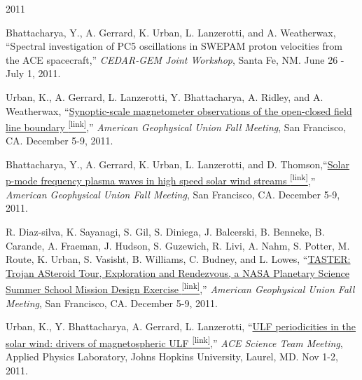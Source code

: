 \documentclass[10pt]{article}
\begin{document}
\begin{center} \Large{2011} \end{center}
\normalsize
\begin{itemize*}

  \item Bhattacharya, Y., A. Gerrard, K. Urban, L. Lanzerotti, and A.
    Weatherwax, ``Spectral investigation of PC5 oscillations in SWEPAM proton
    velocities from the ACE spacecraft,'' {\em CEDAR-GEM Joint
    Workshop}, Santa Fe, NM. June 26 - July 1, 2011.

  \item Urban, K., A. Gerrard, L. Lanzerotti, Y. Bhattacharya, A. Ridley, and A.
    Weatherwax,
    ``\href{https://scholar.google.com/citations?view_op=view_citation&hl=en&user=KTLuoQkAAAAJ&citation_for_view=KTLuoQkAAAAJ:Y0pCki6q_DkC}{Synoptic-scale magnetometer observations of the open-closed
    field line boundary \textsuperscript{\tiny{[link]}}},'' {\em American Geophysical Union Fall
    Meeting}, San Francisco, CA. December 5-9, 2011.

  \item
    Bhattacharya, Y., A. Gerrard, K. Urban, L. Lanzerotti, and D.
    Thomson,``\href{https://scholar.google.com/citations?view_op=view_citation&hl=en&user=KTLuoQkAAAAJ&citation_for_view=KTLuoQkAAAAJ:YsMSGLbcyi4C}{Solar
    p-mode frequency plasma waves in high speed solar wind streams \textsuperscript{\tiny{[link]}}},''
    {\em American Geophysical Union Fall Meeting}, San Francisco,
    CA. December 5-9, 2011.

  \item
    R. Diaz-silva, K. Sayanagi, S. Gil, S. Diniega, J. Balcerski, B. Benneke,
    B. Carande, A. Fraeman, J. Hudson, S. Guzewich, R. Livi, A. Nahm, S.
    Potter, M. Route, K. Urban, S. Vasisht, B. Williams, C. Budney, and L.
    Lowes,
    ``\href{https://scholar.google.com/citations?view_op=view_citation&hl=en&user=KTLuoQkAAAAJ&citation_for_view=KTLuoQkAAAAJ:W7OEmFMy1HYC}{TASTER:
    Trojan ASteroid Tour, Exploration and Rendezvous, a NASA Planetary
    Science Summer School Mission Design Exercise \textsuperscript{\tiny{[link]}}},'' {\em American
    Geophysical Union Fall Meeting}, San Francisco, CA. December
    5-9, 2011.

  \item Urban, K., Y. Bhattacharya, A. Gerrard, L. Lanzerotti,
    ``\href{http://www.srl.caltech.edu/ACE/meetings/Nov.2011meeting/}{ULF
    periodicities in the solar wind: drivers of magnetospheric
    ULF \textsuperscript{\tiny{[link]}}},'' {\em ACE Science Team Meeting}, Applied Physics Laboratory, Johns Hopkins
    University, Laurel, MD. Nov 1-2, 2011.


\end{itemize*}
\end{document}
